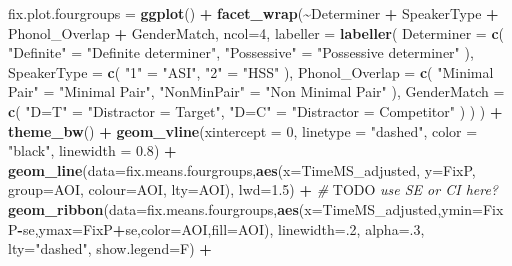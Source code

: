 \documentclass[
]{article}
\newenvironment{Shaded}{\begin{snugshade}}{\end{snugshade}}
\newcommand{\AlertTok}[1]{\textcolor[rgb]{0.94,0.16,0.16}{#1}}
\newcommand{\AttributeTok}[1]{\textcolor[rgb]{0.13,0.29,0.53}{#1}}
\newcommand{\CommentTok}[1]{\textcolor[rgb]{0.56,0.35,0.01}{\textit{#1}}}
\newcommand{\DecValTok}[1]{\textcolor[rgb]{0.00,0.00,0.81}{#1}}
\newcommand{\FloatTok}[1]{\textcolor[rgb]{0.00,0.00,0.81}{#1}}
\newcommand{\FunctionTok}[1]{\textcolor[rgb]{0.13,0.29,0.53}{\textbf{#1}}}
\newcommand{\NormalTok}[1]{#1}
\newcommand{\OtherTok}[1]{\textcolor[rgb]{0.56,0.35,0.01}{#1}}
\newcommand{\SpecialCharTok}[1]{\textcolor[rgb]{0.81,0.36,0.00}{\textbf{#1}}}
\newcommand{\StringTok}[1]{\textcolor[rgb]{0.31,0.60,0.02}{#1}}
\begin{document}
\begin{Shaded}
\begin{Highlighting}[]
\NormalTok{fix.plot.fourgroups }\OtherTok{=} \FunctionTok{ggplot}\NormalTok{() }\SpecialCharTok{+} 
  \FunctionTok{facet\_wrap}\NormalTok{(}\SpecialCharTok{\textasciitilde{}}\NormalTok{Determiner }\SpecialCharTok{+}\NormalTok{ SpeakerType }\SpecialCharTok{+}\NormalTok{ Phonol\_Overlap }\SpecialCharTok{+}\NormalTok{ GenderMatch, }\AttributeTok{ncol=}\DecValTok{4}\NormalTok{,}
             \AttributeTok{labeller =} \FunctionTok{labeller}\NormalTok{(}
              \AttributeTok{Determiner =} \FunctionTok{c}\NormalTok{(}
                \StringTok{"Definite"} \OtherTok{=} \StringTok{"Definite determiner"}\NormalTok{,}
                \StringTok{"Possessive"} \OtherTok{=} \StringTok{"Possessive determiner"}
\NormalTok{              ),}
              \AttributeTok{SpeakerType =} \FunctionTok{c}\NormalTok{(}
                \StringTok{"1"} \OtherTok{=} \StringTok{"ASI"}\NormalTok{,}
                \StringTok{"2"} \OtherTok{=} \StringTok{"HSS"}
\NormalTok{              ),}
              \AttributeTok{Phonol\_Overlap =} \FunctionTok{c}\NormalTok{(}
                \StringTok{"Minimal Pair"} \OtherTok{=} \StringTok{"Minimal Pair"}\NormalTok{,}
                \StringTok{"NonMinPair"} \OtherTok{=} \StringTok{"Non Minimal Pair"}
\NormalTok{              ),}
              \AttributeTok{GenderMatch =} \FunctionTok{c}\NormalTok{(}
                \StringTok{"D=T"} \OtherTok{=} \StringTok{"Distractor = Target"}\NormalTok{,}
                \StringTok{"D=C"} \OtherTok{=} \StringTok{"Distractor = Competitor"}
\NormalTok{              )}
\NormalTok{            )}
\NormalTok{             ) }\SpecialCharTok{+} \FunctionTok{theme\_bw}\NormalTok{() }\SpecialCharTok{+} 
  \FunctionTok{geom\_vline}\NormalTok{(}\AttributeTok{xintercept =} \DecValTok{0}\NormalTok{, }\AttributeTok{linetype =} \StringTok{"dashed"}\NormalTok{, }\AttributeTok{color =} \StringTok{"black"}\NormalTok{, }\AttributeTok{linewidth =} \FloatTok{0.8}\NormalTok{) }\SpecialCharTok{+}
  \FunctionTok{geom\_line}\NormalTok{(}\AttributeTok{data=}\NormalTok{fix.means.fourgroups,}\FunctionTok{aes}\NormalTok{(}\AttributeTok{x=}\NormalTok{TimeMS\_adjusted, }\AttributeTok{y=}\NormalTok{FixP, }\AttributeTok{group=}\NormalTok{AOI, }\AttributeTok{colour=}\NormalTok{AOI, }\AttributeTok{lty=}\NormalTok{AOI), }\AttributeTok{lwd=}\FloatTok{1.5}\NormalTok{) }\SpecialCharTok{+} \CommentTok{\# }\AlertTok{TODO}\CommentTok{ use SE or CI here?}
  \FunctionTok{geom\_ribbon}\NormalTok{(}\AttributeTok{data=}\NormalTok{fix.means.fourgroups,}\FunctionTok{aes}\NormalTok{(}\AttributeTok{x=}\NormalTok{TimeMS\_adjusted,}\AttributeTok{ymin=}\NormalTok{FixP}\SpecialCharTok{{-}}\NormalTok{se,}\AttributeTok{ymax=}\NormalTok{FixP}\SpecialCharTok{+}\NormalTok{se,}\AttributeTok{color=}\NormalTok{AOI,}\AttributeTok{fill=}\NormalTok{AOI), }\AttributeTok{linewidth=}\NormalTok{.}\DecValTok{2}\NormalTok{, }\AttributeTok{alpha=}\NormalTok{.}\DecValTok{3}\NormalTok{, }\AttributeTok{lty=}\StringTok{"dashed"}\NormalTok{, }\AttributeTok{show.legend=}\NormalTok{F)  }\SpecialCharTok{+}

\end{Highlighting}
\end{Shaded}
\end{document}
